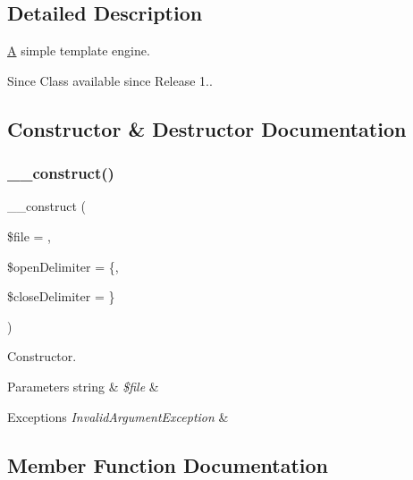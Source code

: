 \subsection{Detailed Description}
\mbox{\hyperlink{class_a}{A}} simple template engine.

\begin{DoxySince}{Since}
Class available since Release 1.. 
\end{DoxySince}


\subsection{Constructor \& Destructor Documentation}
\mbox{\label{class_text___template_a5265a161c2510fb4219e82afd47143d1}} 
\subsubsection{\texorpdfstring{\+\_\+\+\_\+construct()}{\_\_construct()}}
{\footnotesize\ttfamily \+\_\+\+\_\+construct (\begin{DoxyParamCaption}\item[{}]{\$file = {\ttfamily \textquotesingle{}\textquotesingle{}},  }\item[{}]{\$open\+Delimiter = {\ttfamily \textquotesingle{}\{\textquotesingle{}},  }\item[{}]{\$close\+Delimiter = {\ttfamily \textquotesingle{}\}\textquotesingle{}} }\end{DoxyParamCaption})}

Constructor.


\begin{DoxyParams}[1]{Parameters}
string & {\em \$file} & \\
\hline
\end{DoxyParams}

\begin{DoxyExceptions}{Exceptions}
{\em Invalid\+Argument\+Exception} & \\
\hline
\end{DoxyExceptions}


\subsection{Member Function Documentation}
\mbox{\label{class_text___template_afde88292c44dc59faf017738dae6dffb}} 
